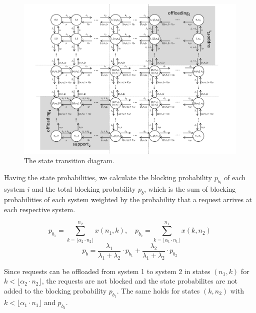 \begin{figure}[tb]
	\centering
 	\includegraphics[width=1.0\textwidth]{aggregation/performance_model/figures/states}
  	\caption{The state transition diagram.}
  	\label{fig:statetransitions}
\end{figure}

Having the state probabilities, we calculate the blocking probability $p_{b_i}$ of each system $i$ and the total blocking probability $p_b$, which is the sum of blocking probabilities of each system weighted by the probability that a request arrives at each respective system.

\begin{equation}
p_{b_1} = \sum_{k=\lfloor\alpha_2\cdot n_2\rfloor}^{n_2} x(n_1,k),\quad p_{b_2} = \sum_{k=\lfloor\alpha_1\cdot n_1\rfloor}^{n_1} x(k,n_2)
\end{equation}
\begin{equation}
 p_{b} = \frac{\lambda_1}{\lambda_1+\lambda_2}\cdot p_{b_1}+\frac{\lambda_2}{\lambda_1+\lambda_2}\cdot p_{b_2}
\end{equation}

Since requests can be offloaded from system 1 to system 2 in states $(n_1, k)$ for $k<\lfloor\alpha_2\cdot n_2\rfloor$, the requests are not blocked and the state probabilites are not added to the blocking probability $p_{b_1}$. The same holds for states $(k, n_2)$ with $k<\lfloor\alpha_1\cdot n_1\rfloor$ and $p_{b_2}$.

%
%
%

